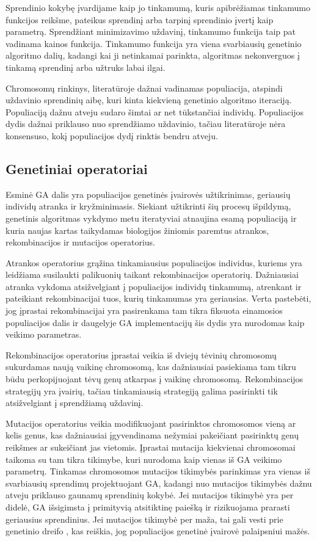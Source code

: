 \documentclass{VUMIFInfBakalaurinis}
\begin{document}
Sprendinio kokybę įvardijame kaip jo tinkamumą, kuris apibrėžiamas tinkamumo funkcijos reikšme, pateikus sprendinį arba tarpinį sprendinio įvertį kaip parametrą.
Sprendžiant minimizavimo uždavinį, tinkamumo funkcija taip pat vadinama kainos funkcija.
Tinkamumo funkcija yra viena svarbiausių genetinio algoritmo dalių,
kadangi kai ji netinkamai parinkta, algoritmas nekonverguos į tinkamą sprendinį arba užtruks labai ilgai.

Chromosomų rinkinys, literatūroje dažnai vadinamas populiacija, atspindi uždavinio sprendinių aibę, kuri kinta kiekvieną genetinio algoritmo iteraciją.
Populiaciją dažnu atveju sudaro šimtai ar net tūkstančiai individų.
Populiacijos dydis dažnai priklauso nuo sprendžiamo uždavinio,
tačiau literatūroje nėra konsensuso, kokį populiacijos dydį rinktis bendru atveju.


\subsection{Genetiniai operatoriai}

Esminė GA dalis yra populiacijos genetinės įvairovės užtikrinimas, geriausių individų atranka ir kryžminimasis.
Siekiant užtikrinti šių procesų išpildymą, genetinis algoritmas vykdymo metu
iteratyviai atnaujina esamą populiaciją ir kuria naujas kartas
taikydamas biologijos žiniomis paremtus atrankos, rekombinacijos ir mutacijos operatorius.

Atrankos operatorius grąžina tinkamiausius populiacijos individus, kuriems yra leidžiama susilaukti palikuonių taikant rekombinacijos operatorių.
Dažniausiai atranka vykdoma atsižvelgiant į populiacijos individų tinkamumą, atrenkant ir pateikiant rekombinacijai tuos, kurių tinkamumas yra geriausias.
Verta pastebėti, jog įprastai rekombinacijai yra pasirenkama tam tikra fiksuota einamosios populiacijos dalis
ir daugelyje GA implementacijų šis dydis yra nurodomas kaip veikimo parametras.

Rekombinacijos operatorius įprastai veikia iš dviejų tėvinių chromosomų sukurdamas naują vaikinę chromosomą, kas dažniausiai pasiekiama
tam tikru būdu perkopijuojant tėvų genų atkarpas į vaikinę chromosomą.
Rekombinacijos strategijų yra įvairių, tačiau tinkamiausią strategiją galima pasirinkti tik atsižvelgiant į sprendžiamą uždavinį.

Mutacijos operatorius veikia modifikuojant pasirinktos chromosomos vieną ar kelis genus,
kas dažniausiai įgyvendinama nežymiai pakeičiant pasirinktų genų reikšmes ar sukeičiant jas vietomis.
Įprastai mutacija kiekvienai chromosomai taikoma su tam tikra tikimybe, kuri nurodoma kaip vienas iš GA veikimo parametrų.
Tinkamas chromosomos mutacijos tikimybės parinkimas yra vienas iš svarbiausių sprendimų projektuojant GA,
kadangi nuo mutacijos tikimybės dažnu atveju priklauso gaunamų sprendinių kokybė.
Jei mutacijos tikimybė yra per didelė, GA išsigimsta į primityvią atsitiktinę paiešką \cite{hassanat2019choosing} ir rizikuojama prarasti geriausius sprendinius.
Jei mutacijos tikimybė per maža, tai gali vesti prie genetinio dreifo \cite{masel2011genetic},
kas reiškia, jog populiacijos genetinė įvairovė palaipsniui mažės.
\end{document}
